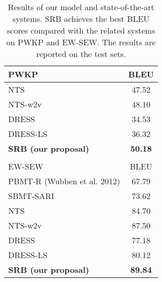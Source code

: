 \documentclass{clv3}
\begin{document}
\begin{CJK*}{UTF8}{gbsn}
\begin{table}[tb]
	\centering
	\caption{Results of our model and state-of-the-art systems. SRB achieves the best BLEU scores compared with the related systems on PWKP and EW-SEW. The results are reported on the test sets.} \label{tab5}
	\newcommand{\tabincell}[2]{\begin{tabular}{@{}#1@{}}#2\end{tabular}}
	\begin{tabular}{|l|c|}
		\hline
		PWKP & BLEU \\
		\hline
		NTS~\cite{NisioiEA2017} & 47.52  \\
		NTS-w2v~\cite{NisioiEA2017} & 48.10  \\
		DRESS~\cite{ZhangEA2017} &  34.53  \\
		DRESS-LS~\cite{ZhangEA2017} &  36.32   \\ 
		\hline
		\textbf{SRB (our proposal)} &  \textbf{50.18}  \\ \hline
		\multicolumn{2}{c}{} \\
		\hline
		EW-SEW & BLEU  \\
		\hline
		PBMT-R (Wubben et al. 2012) &  67.79  \\
		SBMT-SARI~\cite{XuEA2016} &  73.62   \\ \hline
		NTS~\cite{NisioiEA2017} &  84.70  \\
		NTS-w2v~\cite{NisioiEA2017} & 87.50  \\
		DRESS~\cite{ZhangEA2017} &  77.18   \\
		DRESS-LS~\cite{ZhangEA2017} &  80.12   \\
		\hline
		\textbf{SRB (our proposal)} &  \textbf{89.84}    \\ \hline
	\end{tabular}
\end{table}



\end{CJK*}
\end{document}
